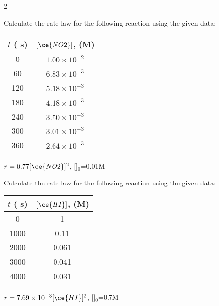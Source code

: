 \documentclass[main.tex]{subfiles}
\begin{document}
\begin{multicols*}{2}
	

\begin{question}[ID=\the\value{numA}]
Calculate the rate law for the following reaction using the given data:  
\begin{center}\begin{tabular}[t]{   c  c   }
\toprule
  $t$ ( s)	&$[\ce{NO2}]$, (M) \\
\midrule
0&	$1.00\times10^{-2}$\\
60&	$6.83\times10^{-3}$\\
120&	$5.18\times10^{-3}$\\
180&	$4.18\times10^{-3}$\\
240&$3.50\times10^{-3}$\\
300&$	3.01\times10^{-3}$\\
360&	$2.64\times10^{-3}$\\
\bottomrule
\end{tabular}\end{center}
\end{question}
\begin{solution}
 $r=0.77[\ce{NO2}]^2$, []$_0$=0.01M
\hspace{0.1cm}\end{solution}%

\begin{question}[ID=\the\value{numA}]
Calculate the rate law for the following reaction using the given data:  
\begin{center}\begin{tabular}[t]{   c  c   }
\toprule
  $t$ ( s)	&$[\ce{HI}]$, (M) \\
\midrule
		0	&	1\\
		1000	&	0.11\\
		2000	&	0.061\\
		3000	&	0.041\\
		4000	&	0.031\\
\bottomrule
\end{tabular}\end{center}
\end{question}
\begin{solution}
 $r=7.69\times 10^{-3}[\ce{HI}]^2$, []$_0$=0.7M
\hspace{0.1cm}\end{solution}%
		

\end{multicols*}
\end{document}
